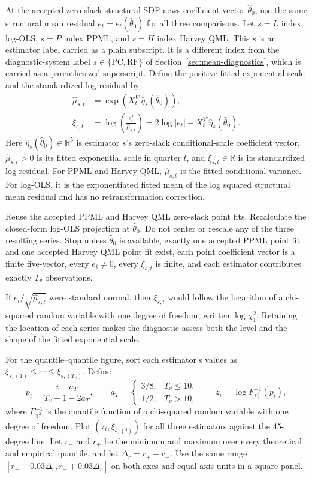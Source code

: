 \documentclass[11pt]{article}
\begin{document}
At the accepted zero-slack structural SDF-news coefficient vector
\(\widehat\theta_0\), use the same structural mean residual
\(e_t=e_t(\widehat\theta_0)\) for all three comparisons. Let \(s=L\) index log-OLS, \(s=P\) index
PPML, and \(s=H\) index Harvey QML. This \(s\) is an estimator label carried as a plain subscript.
It is a different index from the diagnostic-system label \(s\in\{\mathrm{PC},\mathrm{RF}\}\) of
Section~\ref{sec:mean-diagnostics}, which is carried as a parenthesized superscript. Define the
positive fitted exponential scale and the standardized log residual by
\begin{align*}
 \widehat\mu_{s,t}
 &=\exp\!\left(X_t^{V\prime}\widehat\eta_s(\widehat\theta_0)\right),\\
 \xi_{s,t}
 &=\log\!\left(\frac{e_t^2}{\widehat\mu_{s,t}}\right)
  =2\log|e_t|-X_t^{V\prime}\widehat\eta_s(\widehat\theta_0).
\end{align*}
Here \(\widehat\eta_s(\widehat\theta_0)\in\mathbb R^5\) is estimator \(s\)'s
zero-slack conditional-scale coefficient vector, \(\widehat\mu_{s,t}>0\) is its
fitted exponential scale in quarter \(t\), and \(\xi_{s,t}\in\mathbb R\) is its
standardized log residual. For PPML and Harvey QML,
\(\widehat\mu_{s,t}\) is the fitted conditional variance. For log-OLS, it is
the exponentiated fitted mean of the log squared structural mean residual and
has no retransformation correction.

Reuse the accepted PPML and Harvey QML zero-slack point fits. Recalculate the
closed-form log-OLS projection at \(\widehat\theta_0\). Do not center or rescale
any of the three resulting series. Stop unless \(\widehat\theta_0\) is
available, exactly one accepted PPML point fit and one accepted Harvey QML point
fit exist, each point coefficient vector is a finite five-vector, every
\(e_t\ne0\), every \(\xi_{s,t}\) is finite, and each estimator contributes
exactly \(T_v\) observations.

If \(e_t/\sqrt{\widehat\mu_{s,t}}\) were standard normal, then
\(\xi_{s,t}\) would follow the logarithm of a chi-squared random variable with
one degree of freedom, written \(\log\chi_1^2\). Retaining the location of each series
makes the diagnostic assess both the level and the shape of the fitted exponential scale.

For the quantile--quantile figure, sort each estimator's values as
\(\xi_{s,(1)}\le\cdots\le\xi_{s,(T_v)}\). Define
\begin{equation*}
 p_i=\frac{i-a_T}{T_v+1-2a_T},\qquad
 a_T=
 \begin{cases}
  3/8,&T_v\le10,\\
  1/2,&T_v>10,
 \end{cases}
 \qquad
 z_i=\log F_{\chi_1^2}^{-1}(p_i),
\end{equation*}
where \(F_{\chi_1^2}^{-1}\) is the quantile function of a chi-squared random
variable with one degree of freedom. Plot \((z_i,\xi_{s,(i)})\) for all three
estimators against the 45-degree line. Let \(r_-\) and \(r_+\) be the minimum
and maximum over every theoretical and empirical quantile, and let
\(\Delta_r=r_+-r_-\). Use the same range
\([r_--0.03\Delta_r,r_++0.03\Delta_r]\) on both axes and equal axis units in a
square panel.
\end{document}
